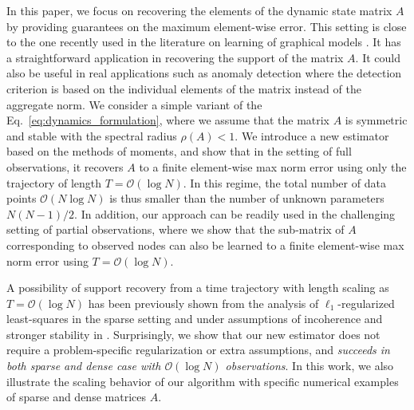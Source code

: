 \documentclass[11pt]{article}
\begin{document}
In this paper, we focus on recovering the elements of the dynamic state matrix $A$ by providing guarantees on the maximum element-wise error. This setting is close to the one recently used in the literature on learning of graphical models \cite{klivans2017learning, vuffray2020efficient}. It has a straightforward application in recovering the support of the matrix $A$. It could also be useful in real applications such as anomaly detection \cite{hannon2021real} where the detection criterion is based on the individual elements of the matrix instead of the aggregate norm. We consider a simple variant of the Eq.~\eqref{eq:dynamics_formulation}, where we assume that the matrix $A$ is symmetric and stable with the spectral radius $\rho(A) < 1$. We introduce a new estimator based on the methods of moments, and show that in the setting of full observations, it recovers $A$ to a finite element-wise max norm error using only the trajectory of length $T = \mathcal{O}(\log N)$. In this regime, the total number of data points $\mathcal{O}(N \log N)$ is thus smaller than the number of unknown parameters $N(N-1)/2$. In addition, our approach can be readily used in the challenging setting of partial observations, where we show that the sub-matrix of $A$ corresponding to observed nodes can also be learned to a finite element-wise max norm error using $T=\mathcal{O}(\log N)$.

A possibility of support recovery from a time trajectory with length scaling as $T = \mathcal{O}(\log N)$ has been previously shown from the analysis of $\ell_1$-regularized least-squares in the sparse setting and under assumptions of incoherence and stronger stability in \cite{Bento2010learning}. Surprisingly, we show that our new estimator does not require a problem-specific regularization or extra assumptions, and \emph{succeeds in both sparse and dense case with $\mathcal{O}(\log N)$ observations}. In this work, we also illustrate the scaling behavior of our algorithm with specific numerical examples of sparse and dense matrices $A$.     

\end{document}
